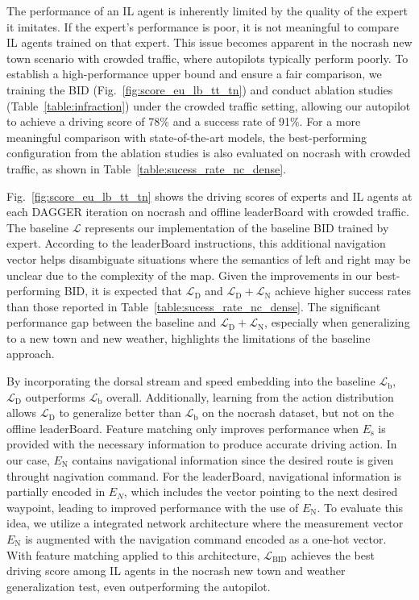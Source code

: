 \hspace{1pc}The performance of an IL agent is inherently limited by the quality of the expert it imitates. 
If the expert's performance is poor, it is not meaningful to compare IL agents trained on that expert. 
This issue becomes apparent in the nocrash new town scenario with crowded traffic, where autopilots typically perform poorly. 
To establish a high-performance upper bound and ensure a fair comparison, we training the BID (Fig.~\ref{fig:score_eu_lb_tt_tn}) and conduct ablation studies (Table~\ref{table:infraction}) under the crowded traffic setting, allowing our autopilot to achieve a driving score of 78\% and a success rate of 91\%. 
For a more meaningful comparison with state-of-the-art models, the best-performing configuration from the ablation studies is also evaluated on nocrash with crowded traffic, as shown in Table~\ref{table:sucess_rate_nc_dense}.


Fig.~\ref{fig:score_eu_lb_tt_tn} shows the driving scores of experts and IL agents at each DAGGER iteration on nocrash and offline leaderBoard with crowded traffic.
The baseline $\mathcal{L}$ represents our implementation of the baseline BID trained by expert. 
According to the leaderBoard instructions, this additional navigation vector helps disambiguate situations where the semantics of left and right may be unclear due to the complexity of the map.
Given the improvements in our best-performing BID, it is expected that $\mathcal{L}_\text{D}$ and $\mathcal{L}_\text{D} + \mathcal{L}_\text{N}$ achieve higher success rates than those reported in Table~\ref{table:sucess_rate_nc_dense}.
The significant performance gap between the baseline and $\mathcal{L}_\text{D} + \mathcal{L}_\text{N}$, especially when generalizing to a new town and new weather, highlights the limitations of the baseline approach.


By incorporating the dorsal stream and speed embedding into the baseline $\mathcal{L}_\text{b}$, $\mathcal{L}_\text{D}$ outperforms $\mathcal{L}_\text{b}$ overall.
Additionally, learning from the action distribution allows $\mathcal{L}_\text{D}$ to generalize better than $\mathcal{L}_\text{b}$ on the nocrash dataset, but not on the offline leaderBoard.
Feature matching only improves performance when $E_\text{s}$ is provided with the necessary information to produce accurate driving action.
In our case, $E_\text{N}$ contains navigational information since the desired route is given throught nagivation command.
For the leaderBoard, navigational information is partially encoded in $E_N$, which includes the vector pointing to the next desired waypoint, leading to improved performance with the use of $E_\text{N}$.
To evaluate this idea, we utilize a integrated network architecture where the measurement vector $E_\text{N}$ is augmented with the navigation command encoded as a one-hot vector.
With feature matching applied to this architecture, $\mathcal{L}_\text{BID}$ achieves the best driving score among IL agents in the nocrash new town and weather generalization test, even outperforming the autopilot.



